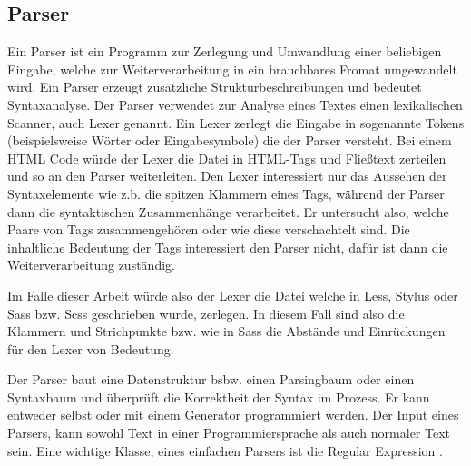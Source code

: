 \subsection{Parser}
Ein Parser ist ein Programm zur Zerlegung und Umwandlung einer beliebigen Eingabe, welche zur Weiterverarbeitung in ein brauchbares Fromat umgewandelt wird. Ein Parser erzeugt zusätzliche Strukturbeschreibungen und bedeutet Syntaxanalyse. \newline
Der Parser verwendet zur Analyse eines Textes einen lexikalischen Scanner, auch Lexer genannt. Ein Lexer zerlegt die Eingabe in sogenannte Tokens (beispielsweise Wörter oder Eingabesymbole) die der Parser versteht. \newline
Bei einem HTML Code würde der Lexer die Datei in HTML-Tags und Fließtext zerteilen und so an den Parser weiterleiten. Den Lexer interessiert nur das Aussehen der Syntaxelemente wie z.b. die spitzen Klammern eines Tags, während der Parser dann die syntaktischen Zusammenhänge verarbeitet. Er untersucht also, welche Paare von Tags zusammengehören oder wie diese verschachtelt sind. Die inhaltliche Bedeutung der Tags interessiert den Parser nicht, dafür ist dann die Weiterverarbeitung zuständig.

Im Falle dieser Arbeit würde also der Lexer die Datei welche in Less, Stylus oder Sass bzw. Scss geschrieben wurde, zerlegen. In diesem Fall sind also die Klammern und Strichpunkte bzw. wie in Sass die Abstände und Einrückungen für den Lexer von Bedeutung.

Der Parser baut eine Datenstruktur bsbw. einen Parsingbaum oder einen Syntaxbaum und überprüft die Korrektheit der Syntax im Prozess. Er kann entweder selbst oder mit einem Generator programmiert werden. Der Input eines Parsers, kann sowohl Text in einer Programmiersprache als auch normaler Text sein. Eine wichtige Klasse, eines einfachen Parsers ist die \glqq{} Regular Expression \grqq{}.

